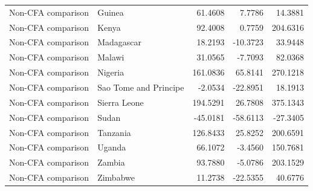 \begin{table}
\begin{tabular}[t]{llrrr}
Non-CFA comparison & Guinea & 61.4608 & 7.7786 & 14.3881\\
Non-CFA comparison & Kenya & 92.4008 & 0.7759 & 204.6316\\
\addlinespace
Non-CFA comparison & Madagascar & 18.2193 & -10.3723 & 33.9448\\
Non-CFA comparison & Malawi & 31.0565 & -7.7093 & 82.0368\\
Non-CFA comparison & Nigeria & 161.0836 & 65.8141 & 270.1218\\
Non-CFA comparison & Sao Tome and Principe & -2.0534 & -22.8951 & 18.1913\\
Non-CFA comparison & Sierra Leone & 194.5291 & 26.7808 & 375.1343\\
\addlinespace
Non-CFA comparison & Sudan & -45.0181 & -58.6113 & -27.3405\\
Non-CFA comparison & Tanzania & 126.8433 & 25.8252 & 200.6591\\
Non-CFA comparison & Uganda & 66.1072 & -3.4560 & 150.7681\\
Non-CFA comparison & Zambia & 93.7880 & -5.0786 & 203.1529\\
Non-CFA comparison & Zimbabwe & 11.2738 & -22.5355 & 40.6776\\
\bottomrule
\end{tabular}
\end{table}
